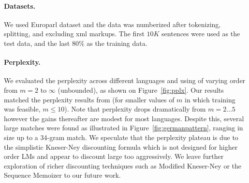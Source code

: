 
\paragraph{Datasets.}
We used Europarl dataset and the data was numberized after tokenizing, splitting, and excluding xml markups. The first $10K$ sentences were used as the test data, and the last 80\% as the training data. %


\paragraph{Perplexity.}
We evaluated the perplexity across different languages and using \ngrams of varying order from $m=2$ to $\infty$ (unbounded), as shown on Figure~\ref{fig:pplx}.
Our results matched the perplexity results from \SRILM (for smaller values of $m$ in which \SRILM training was feasible, $m \le 10$).
Note that perplexity drops dramatically from $m=2\ldots5$ however the gains thereafter are modest for most languages.
Despite this, several large \ngram matches were found as illustrated in Figure~\ref{fig:germanpattern}, ranging in size up to a 34-gram match.
We speculate that the perplexity plateau is due to the simplistic Kneser-Ney discounting formula which is not designed for higher order \ngram LMs and appear to discount large \ngrams too aggressively. 
We leave further exploration of richer discounting techniques such as Modified Kneser-Ney \cite{chen_goodman} or the Sequence Memoizer \cite{wood_teh} to our future work.


